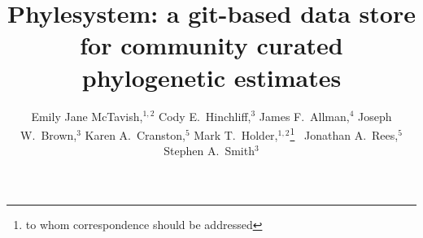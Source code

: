 \documentclass{bioinfo}
\begin{document}
\title[phylesystem git phylostore]{Phylesystem: a git-based data store for community curated phylogenetic estimates}

\author[McTavish \textit{et~al}]{
    Emily Jane McTavish,$^{1,2}$
    Cody E.~Hinchliff,${^3}$
    James F.~Allman,${^4}$
    Joseph W.~Brown,${^3}$
    Karen A.~Cranston,${^5}$
    Mark T.~Holder,$^{1,2}$\footnote{to whom correspondence should be addressed}~
    Jonathan A.~Rees,${^5}$
    Stephen A.~Smith${^3}$
}
\address{$^{1}$Department of Ecology and Evolutionary Biology, University of Kansas, Lawrence KS, USA\\
$^{2}$Heidelberg Institute of Theoretical Studies, Heidelberg, Germany \\
$^{3}$Department of Ecology and Evolutionary Biology, University of Michigan, Ann Arbor, Michigan, USA\\
$^{4}$Interrobang Corporation, Wake Forest, North Carolina, USA\\
$^{5}$National Evolutionary Synthesis Center, Duke University, Durham, North Carolina, USA}


\maketitle
\end{document}
